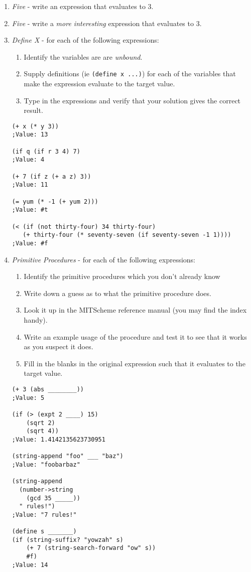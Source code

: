 \begin{enumerate}
\item {\large {\it Five}} - write an expression that evaluates to 3.
\vspace{.5in}
\item {\LARGE {\it Five}} - write a {\it more interesting} expression
that evaluates to 3.
\vspace{.5in}
\newpage
\item {\large {\it Define X}} - for each of the following expressions:
\begin{enumerate}
\item Identify the variables are are {\it unbound}.
\item Supply definitions (ie {\tt (define x ...)}) for each of the
variables that make the expression evaluate to the target value.
\item Type in the expressions and verify that your solution gives the
correct result.
\end{enumerate}

\begin{verbatim}
(+ x (* y 3))
;Value: 13

(if q (if r 3 4) 7)
;Value: 4

(+ 7 (if z (+ a z) 3))
;Value: 11

(= yum (* -1 (+ yum 2)))
;Value: #t

(< (if (not thirty-four) 34 thirty-four)
   (+ thirty-four (* seventy-seven (if seventy-seven -1 1))))
;Value: #f
\end{verbatim}

\newpage
\item {\large {\it Primitive Procedures}} - for each of the following
expressions:
\begin{enumerate}
\item Identify the primitive procedures which you don't already know
\item Write down a guess as to what the primitive procedure does.
\item Look it up in the MITScheme reference manual (you may find the
index handy).
\item Write an example usage of the procedure and test it to see that
it works as you suspect it does.
\item Fill in the blanks in the original expression such that it
evaluates to the target value.
\end{enumerate}

\begin{verbatim}
(+ 3 (abs ________))
;Value: 5

(if (> (expt 2 ____) 15)
    (sqrt 2)
    (sqrt 4))
;Value: 1.4142135623730951

(string-append "foo" ___ "baz")
;Value: "foobarbaz"

(string-append
  (number->string
    (gcd 35 _____))
  " rules!")
;Value: "7 rules!"

(define s _______)
(if (string-suffix? "yowzah" s)
    (+ 7 (string-search-forward "ow" s))
    #f)
;Value: 14
\end{verbatim}

\end{enumerate}


